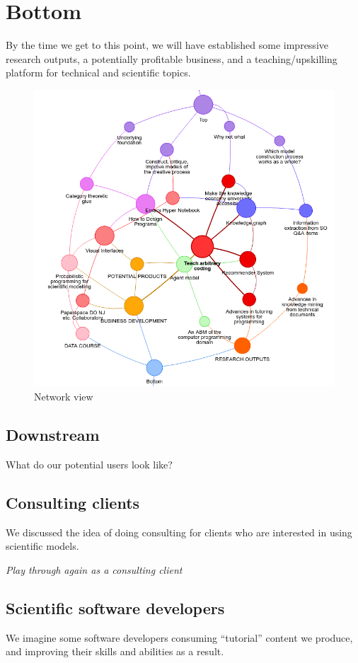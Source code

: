\documentclass[11pt]{article}
\begin{document}
\section{Bottom}
\label{sec:org21ede1d}
By the time we get to this point, we will have established some
impressive research outputs, a potentially profitable business, and a
teaching/upskilling platform for technical and scientific topics.

\begin{figure}[htbp]
\centering
\includegraphics[width=\textwidth]{org-roam-server-3oct2020.png}
\caption{Network view}
\end{figure}

\subsection{Downstream}
\label{sec:org32a9201}
What do our potential users look like?
\subsection{Consulting clients}
\label{sec:orgca41ce5}
We discussed the idea of doing consulting for clients who are
interested in using scientific models.

\emph{Play through again as a consulting client}
\subsection{Scientific software developers}
\label{sec:orgfc5c842}
We imagine some software developers consuming “tutorial” content we
produce, and improving their skills and abilities as a result.
\end{document}
